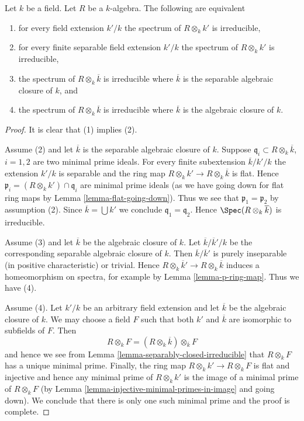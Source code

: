 \begin{lemma}
\label{lemma-geometrically-irreducible}
Let $k$ be a field.
Let $R$ be a $k$-algebra.
The following are equivalent
\begin{enumerate}
\item for every field extension $k'/k$ the
spectrum of $R \otimes_k k'$ is irreducible,
\item for every finite separable field extension $k'/k$ the
spectrum of $R \otimes_k k'$ is irreducible,
\item the spectrum of $R \otimes_k \overline{k}$ is irreducible
where $\overline{k}$ is the separable algebraic closure of $k$, and
\item the spectrum of $R \otimes_k \overline{k}$ is irreducible
where $\overline{k}$ is the algebraic closure of $k$.
\end{enumerate}
\end{lemma}

\begin{proof}
It is clear that (1) implies (2).

\medskip\noindent
Assume (2) and let $\overline{k}$ is the separable algebraic closure of $k$.
Suppose $\mathfrak q_i \subset R \otimes_k \overline{k}$, $i = 1, 2$
are two minimal prime ideals. For every finite subextension
$\overline{k}/k'/k$ the extension $k'/k$ is separable and
the ring map $R \otimes_k k' \to R \otimes_k \overline{k}$
is flat. Hence $\mathfrak p_i = (R \otimes_k k') \cap \mathfrak q_i$
are minimal prime ideals (as we have going down for flat ring maps
by Lemma \ref{lemma-flat-going-down}). Thus we see that
$\mathfrak p_1 = \mathfrak p_2$
by assumption (2). Since $\overline{k} = \bigcup k'$ we conclude
$\mathfrak q_1 = \mathfrak q_2$. Hence $\Spec(R \otimes_k \overline{k})$
is irreducible.

\medskip\noindent
Assume (3) and let $\overline{k}$ be the algebraic closure of $k$.
Let $\overline{k}/\overline{k}'/k$ be the corresponding
separable algebraic closure of $k$. Then $\overline{k}/\overline{k}'$
is purely inseparable (in positive characteristic) or trivial.
Hence $R \otimes_k \overline{k}' \to R \otimes_k \overline{k}$
induces a homeomorphism on spectra, for example by
Lemma \ref{lemma-p-ring-map}. Thus we have (4).

\medskip\noindent
Assume (4). Let $k'/k$ be an arbitrary field extension and let
$\overline{k}$ be the algebraic closure of $k$. We may choose a
field $F$ such that both $k'$ and $\overline{k}$ are isomorphic
to subfields of $F$. Then
$$
R \otimes_k F = (R \otimes_k \overline{k}) \otimes_{\overline{k}} F
$$
and hence we see from Lemma \ref{lemma-separably-closed-irreducible}
that $R \otimes_k F$ has a unique minimal prime. Finally, the
ring map $R \otimes_k k' \to R \otimes_k F$ is flat and injective
and hence any minimal prime of $R \otimes_k k'$ is the image of
a minimal prime of $R \otimes_k F$ (by
Lemma \ref{lemma-injective-minimal-primes-in-image}
and going down). We conclude that there is only one
such minimal prime and the proof is complete.
\end{proof}